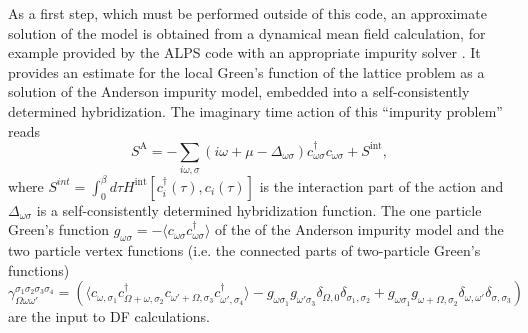 \documentclass[3p,times,procedia]{elsarticle}
\begin{document}
As a first step, which must be performed outside of this code, an approximate solution of the model is obtained from a dynamical mean field calculation, for example provided by the ALPS code \cite{ALPS2} with an appropriate impurity solver \cite{Hafermann2013a}.
It provides an estimate for the local Green's function of the lattice problem as a  solution of the Anderson impurity model, embedded into a self-consistently determined hybridization. The imaginary time action of this ``impurity problem''  reads  
\begin{equation}
S^{\mathrm{A}} = -\sum_{i\omega,\sigma} (i\omega + \mu - \Delta_{\omega\sigma}) c^\dagger_{\omega\sigma} c_{\omega\sigma} + S^{\mathrm{int}},
\end{equation}
where $S^{int} = \int_0^\beta d\tau H^{\mathrm{int}} [c^\dagger_i(\tau), c_i(\tau)] $ is the interaction part of the action and $\Delta_{\omega\sigma}$ is a self-consistently determined hybridization function. 
The one particle Green's function $g_{\omega\sigma} = -\langle c_{\omega\sigma} c^\dagger_{\omega\sigma} \rangle$ of the of the Anderson impurity model and the two particle vertex functions (i.e. the connected parts of two-particle Green's functions)  
\begin{equation}\label{eqn:vertex}
\gamma_{\Omega\omega\omega'}^{\sigma_1\sigma_2\sigma_3\sigma_4} = \left(\langle c_{\omega,\sigma_1} c^\dagger_{\Omega + \omega,\sigma_2} c_{\omega' + \Omega, \sigma_3} c^\dagger_{\omega', \sigma_4}\rangle - g_{\omega\sigma_1}g_{\omega'\sigma_3}\delta_{\Omega,0}\delta_{\sigma_1,\sigma_2} + g_{\omega\sigma_1} g_{\omega + \Omega, \sigma_2} \delta_{\omega,\omega'}\delta_{\sigma, \sigma_3} \right)
\end{equation}
are the input to DF calculations. 
\end{document}
